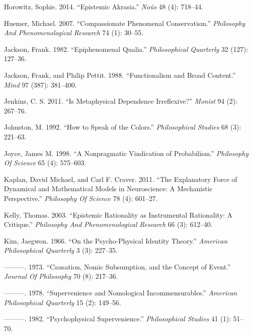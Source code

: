 \documentclass[
  10pt,
  letterpaper,
  DIV=11,
  numbers=noendperiod,
  twoside]{scrartcl}
\newlength{\cslhangindent}
\newenvironment{CSLReferences}[2] %
 {\begin{list}{}{%
  \setlength{\itemindent}{0pt}
  \setlength{\leftmargin}{0pt}
  \setlength{\parsep}{0pt}
  \ifodd #1
   \setlength{\leftmargin}{\cslhangindent}
   \setlength{\itemindent}{-1\cslhangindent}
  \fi
  \setlength{\itemsep}{#2\baselineskip}}}
 {\end{list}}
\begin{document}
\begin{CSLReferences}{1}{0}
Horowitz, Sophie. 2014. {``Epistemic Akrasia.''} \emph{Noûs} 48 (4):
718--44.

Huemer, Michael. 2007. {``Compassionate Phenomenal Conservatism.''}
\emph{Philosophy And Phenomenological Research} 74 (1): 30--55.

Jackson, Frank. 1982. {``Epiphenomenal Qualia.''} \emph{Philosophical
Quarterly} 32 (127): 127--36.

Jackson, Frank, and Philip Pettit. 1988. {``Functionalism and Broad
Content.''} \emph{Mind} 97 (387): 381--400.

Jenkins, C. S. 2011. {``Is Metaphysical Dependence Irreflexive?''}
\emph{Monist} 94 (2): 267--76.

Johnston, M. 1992. {``How to Speak of the Colors.''} \emph{Philosophical
Studies} 68 (3): 221--63.

Joyce, James M. 1998. {``A Nonpragmatic Vindication of Probabilism.''}
\emph{Philosophy Of Science} 65 (4): 575--603.

Kaplan, David Michael, and Carl F. Craver. 2011. {``The Explanatory
Force of Dynamical and Mathematical Models in Neuroscience: A
Mechanistic Perspective.''} \emph{Philosophy Of Science} 78 (4):
601--27.

Kelly, Thomas. 2003. {``Epistemic Rationality as Instrumental
Rationality: A Critique.''} \emph{Philosophy And Phenomenological
Research} 66 (3): 612--40.

Kim, Jaegwon. 1966. {``On the Psycho-Physical Identity Theory.''}
\emph{American Philosophical Quarterly} 3 (3): 227--35.

---------. 1973. {``Causation, Nomic Subsumption, and the Concept of
Event.''} \emph{Journal Of Philosophy} 70 (8): 217--36.

---------. 1978. {``Supervenience and Nomological Incommensurables.''}
\emph{American Philosophical Quarterly} 15 (2): 149--56.

---------. 1982. {``Psychophysical Supervenience.''} \emph{Philosophical
Studies} 41 (1): 51--70.


\end{CSLReferences}
\end{document}
